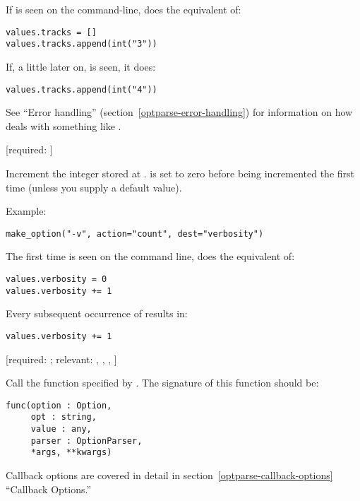 \begin{definitions}
If  is seen on the command-line,  does the equivalent of:

\begin{verbatim}
values.tracks = []
values.tracks.append(int("3"))
\end{verbatim}

If, a little later on,  is seen, it does:

\begin{verbatim}
values.tracks.append(int("4"))
\end{verbatim}

See ``Error handling'' (section~\ref{optparse-error-handling}) for
information on how  deals with something like
.

 [required: ]

Increment the integer stored at .  is set to zero
before being incremented the first time (unless you supply a default
value).

Example:

\begin{verbatim}
make_option("-v", action="count", dest="verbosity")
\end{verbatim}

The first time  is seen on the command line,
 does the equivalent of:

\begin{verbatim}
values.verbosity = 0
values.verbosity += 1
\end{verbatim}

Every subsequent occurrence of  results in:

\begin{verbatim}
values.verbosity += 1
\end{verbatim}

 [required: ;
      relevant: , , ,
      ]

Call the function specified by .  The signature of
this function should be:

\begin{verbatim}
func(option : Option,
     opt : string,
     value : any,
     parser : OptionParser,
     *args, **kwargs)
\end{verbatim}

Callback options are covered in detail in
section~\ref{optparse-callback-options} ``Callback Options.''


\end{definitions}

